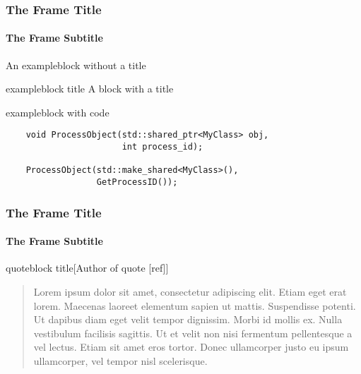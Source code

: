 \documentclass[14pt,dvipsnames,usenames]{beamer}
\begin{document}
\begin{frame}[fragile]
  \frametitle{The Frame Title}
  \framesubtitle{The Frame Subtitle}

  \begin{exampleblock}{}
    An exampleblock without a title
  \end{exampleblock}

  \begin{exampleblock}{exampleblock title}
    A block with a title
  \end{exampleblock}

  \begin{exampleblock}{exampleblock with code}
    \begin{lstlisting}
    void ProcessObject(std::shared_ptr<MyClass> obj, 
                       int process_id);

    ProcessObject(std::make_shared<MyClass>(), 
                  GetProcessID());
    \end{lstlisting}
  \end{exampleblock}

\end{frame}

\begin{frame}
  \frametitle{The Frame Title}
  \framesubtitle{The Frame Subtitle}

  \begin{quoteblock}{quoteblock title}[Author of quote [ref]]
    \begin{quote}\footnotesize
      Lorem ipsum dolor sit amet, consectetur adipiscing elit. Etiam eget erat
      lorem. Maecenas laoreet elementum sapien ut mattis. Suspendisse potenti. Ut
      dapibus diam eget velit tempor dignissim. Morbi id mollis ex. Nulla
      vestibulum facilisis sagittis. Ut et velit non nisi fermentum pellentesque a
      vel lectus. Etiam sit amet eros tortor. Donec ullamcorper justo eu ipsum
      ullamcorper, vel tempor nisl scelerisque.
    \end{quote}
  \end{quoteblock}

\end{frame}
\end{document}
